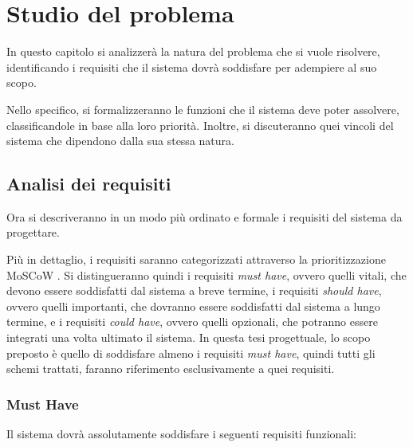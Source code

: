 
\chapter{Studio del problema}
\label{ch:Chapter2}

In questo capitolo si analizzerà la natura del problema che si vuole risolvere,
identificando i requisiti che il sistema dovrà soddisfare per adempiere al suo
scopo.

Nello specifico, si formalizzeranno le funzioni che il sistema deve poter
assolvere, classificandole in base alla loro priorità. Inoltre, si discuteranno
quei vincoli del sistema che dipendono dalla sua stessa natura.

\section{Analisi dei requisiti}
\label{sec:Sezione2.1}

Ora si descriveranno in un modo più ordinato e formale i requisiti del sistema
da progettare.

Più in dettaglio, i requisiti saranno categorizzati attraverso la
prioritizzazione MoSCoW \cite{MOSCOW}. Si distingueranno quindi i requisiti
\textit{must have}, ovvero quelli vitali, che devono essere soddisfatti dal
sistema a breve termine, i requisiti \textit{should have}, ovvero quelli
importanti, che dovranno essere soddisfatti dal sistema a lungo termine, e i
requisiti \textit{could have}, ovvero quelli opzionali, che potranno essere
integrati una volta ultimato il sistema. In questa tesi progettuale, lo scopo
preposto è quello di soddisfare almeno i requisiti \textit{must have}, quindi
tutti gli schemi trattati, faranno riferimento esclusivamente a quei requisiti.

\subsection{Must Have}
\label{subsec:Sezione2.1.1}

Il sistema dovrà assolutamente soddisfare i seguenti requisiti funzionali:

